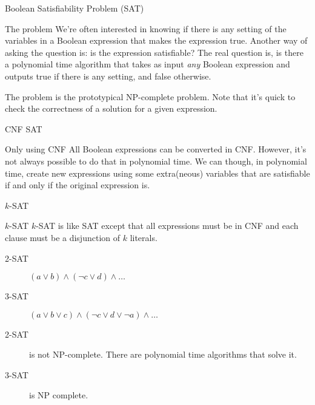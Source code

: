 \begin{frame}{Boolean Satisfiability Problem (SAT)}
  {
    \begin{block}{The problem}
    We're often interested in knowing if there is any setting of the variables in a Boolean expression that makes the expression true.
    Another way of asking the question is: is the expression satisfiable?
    The real question is, is there a polynomial time algorithm that takes as input \emph{any} Boolean expression and outputs true if there is any setting, and false otherwise.
  \end{block}}
  \vspace{0.5cm}
  The problem is the prototypical NP-complete problem.
  Note that it's quick to check the correctness of a solution for a given expression. 
\end{frame}


\begin{frame}{CNF SAT}
  
  {
    \begin{block}{Only using CNF}
    All Boolean expressions can be converted in CNF.
    However, it's not always possible to do that in polynomial time.
    We can though, in polynomial time, create new expressions using some extra(neous) variables that are satisfiable if and only if the original expression is.
  \end{block}}
  \vspace{0.5cm} 
\end{frame}


\begin{frame}{$k$-SAT}
  
  {
    \begin{block}{$k$-SAT}
     $k$-SAT is like SAT except that all expressions must be in CNF and each clause must be a disjunction of $k$ literals.
  \end{block}}
  \vspace{0.25cm}
  \begin{description}
  \item[2-SAT] $(a \vee b) \wedge (\neg c \vee d) \wedge \ldots$
  \vspace{0.25cm}
  \item[3-SAT] $(a \vee b \vee c) \wedge (\neg c \vee d \vee \neg a) \wedge \ldots$
  \end{description}
    \vspace{0.25cm}
   \begin{description}
     \item[2-SAT] is not NP-complete. There are polynomial time algorithms that solve it.
     \vspace{0.25cm}
     \item[3-SAT] is NP complete.
   \end{description}
\end{frame}


